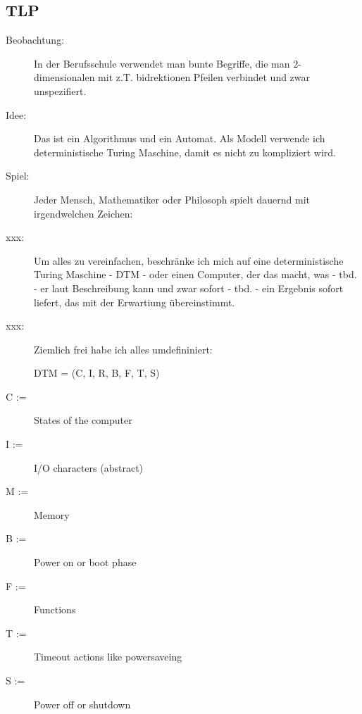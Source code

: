\documentclass[10pt,a4paper]{article}
\begin{document}
\subsection{TLP}



\vskip 16pt
\begin{description}
  
\item[Beobachtung:]
In der Berufsschule verwendet man bunte Begriffe, die man
2-dimensionalen mit z.T. bidrektionen Pfeilen verbindet und
zwar unspezifiert.

\item[Idee:]
Das ist ein Algorithmus und ein Automat.
Als Modell verwende ich deterministische Turing Maschine,
damit es nicht zu kompliziert wird.

\item[Spiel:]
Jeder Mensch, Mathematiker oder Philosoph spielt dauernd mit irgendwelchen Zeichen:

\item[xxx: ]
Um alles zu vereinfachen, beschränke ich mich auf eine
deterministische Turing Maschine - DTM - oder einen Computer, der das macht,
was - tbd. - er laut Beschreibung kann und zwar sofort - tbd. - ein Ergebnis
sofort liefert, das mit der Erwartiung übereinstimmt.

\item[xxx: ]
Ziemlich frei habe ich alles umdefininiert:

DTM = (C, I, R, B, F, T, S)
\end{description}
  
\begin{description}
\item[C := ] States of the computer
\item[I := ] I/O characters (abstract)
\item[M := ] Memory
\item[B := ] Power on or boot phase
\item[F := ] Functions
\item[T := ] Timeout actions like powersaveing
\item[S := ] Power off or shutdown
\end{description}
\end{document}
